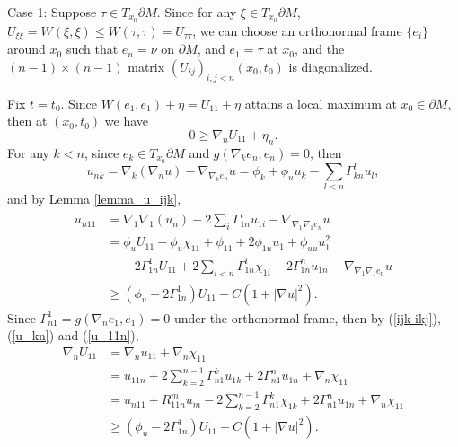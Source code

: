 \documentclass[12pt]{amsart}
\theoremstyle{definition}
\theoremstyle{remark}
\numberwithin{equation}{section}
\begin{document}
Case 1: Suppose $\tau \in T_{x_0}\partial M$. Since for any $\xi \in T_{x_0} \partial M$, $U_{\xi\xi} = W(\xi, \xi) \leq W(\tau, \tau) = U_{\tau\tau}$, we can choose an orthonormal frame $\{e_i\}$ around $x_0$ such that $e_n = \nu$ on $\partial M$, and $e_1 = \tau$ at $x_0$, and the $(n-1)\times (n-1)$ matrix $\left( U_{ij} \right)_{i,j < n}(x_0, t_0)$ is diagonalized. 

Fix $t = t_0$. Since $W(e_1, e_1) + \eta = U_{11} + \eta$ attains a local maximum at $x_0  \in \partial M$, then at $(x_0, t_0)$ we have
\begin{equation}\label{U_11 e^eta_bd}
0 \geq \nabla_n U_{11} + \eta_n.
\end{equation}
For any $k<n$, since $e_k \in T_{x_0}\partial M$ and $g(\nabla_k e_n, e_n) = 0$, then 
\begin{equation}\label{u_kn}
u_{nk} = \nabla_k(\nabla_n u) - \nabla_{\nabla_k e_n}u = \phi_k + \phi_u u_k -\sum_{l<n} \Gamma_{kn}^l u_l,
\end{equation}
and by Lemma \ref{lemma_u_ijk},
\begin{equation}\label{u_11n}
\begin{aligned}
u_{n11} &= \nabla_{1}\nabla_1(u_n) - 2\sum_i \Gamma_{1n}^i u_{1i} - \nabla_{\nabla_{1}\nabla_1 e_n}u\\
&= \phi_u U_{11} - \phi_u \chi_{11} + \phi_{11} + 2\phi_{1u} u_1 + \phi_{uu} u_1^2\\
& \quad - 2\Gamma_{1n}^1 U_{11} + 2\sum_{i<n}\Gamma_{1n}^i \chi_{1i} - 2\Gamma_{1n}^n u_{1n} - \nabla_{\nabla_{1}\nabla_1 e_n}u\\
&\geq (\phi_u - 2\Gamma_{1n}^1) U_{11} - C(1 + |\nabla u|^2).
\end{aligned}
\end{equation}
Since $\Gamma_{n1}^1 = g(\nabla_n e_1, e_1) = 0$ under the orthonormal frame, then by (\ref{ijk-ikj}), (\ref{u_kn}) and (\ref{u_11n}),
\begin{equation}\label{nabla_n U_11}
\begin{aligned}
\nabla_n U_{11} &= \nabla_n u_{11} + \nabla_n \chi_{11}\\
&= u_{11n} + 2 \sum_{k=2}^{n-1}\Gamma_{n1}^{k}u_{1k} + 2\Gamma_{n1}^n u_{1n} + \nabla_n \chi_{11}\\
&= u_{n11} + R_{11n}^m u_m - 2 \sum_{k=2}^{n-1}\Gamma_{n1}^{k}\chi_{1k} + 2\Gamma_{n1}^n u_{1n} + \nabla_n \chi_{11}\\
&\geq (\phi_u - 2\Gamma_{1n}^1) U_{11} - C(1 + |\nabla u|^2).
\end{aligned}
\end{equation}
\end{document}
